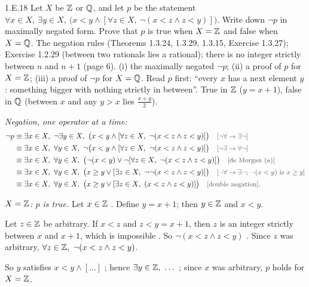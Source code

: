 \begin{bookex}[essential]{1.E.18}
Let $X$ be $\mathbb{Z}$ or $\mathbb{Q}$, and let $p$ be the statement $\forall x\in X,\ \exists y\in X,\ \big(x<y\wedge[\forall z\in X,\ \neg(x<z\wedge z<y)]\big)$. Write down $\neg p$ in maximally negated form. Prove that $p$ is true when $X=\mathbb{Z}$ and false when $X=\mathbb{Q}$.
\solution
\given The negation rules (Theorems 1.3.24, 1.3.29, 1.3.15, Exercise 1.3.27); Exercise 1.2.29 (between two rationals lies a rational); there is no integer strictly between $n$ and $n+1$ (page 6).
\goal (i) the maximally negated $\neg p$; (ii) a proof of $p$ for $X=\mathbb{Z}$; (iii) a proof of $\neg p$ for $X=\mathbb{Q}$.
\plan Read $p$ first: ``every $x$ has a next element $y$: something bigger with nothing strictly in between''. True in $\mathbb{Z}$ ($y=x+1$), false in $\mathbb{Q}$ (between $x$ and any $y>x$ lies $\frac{x+y}2$).
\begin{steps}
\item \emph{Negation, one operator at a time:}
\begin{align*}
\neg p&\equiv\exists x\in X,\ \neg\exists y\in X,\ \big(x<y\wedge[\forall z\in X,\ \neg(x<z\wedge z<y)]\big)\why{$\neg\forall\to\exists\neg$}\\
&\equiv\exists x\in X,\ \forall y\in X,\ \neg\big(x<y\wedge[\forall z\in X,\ \neg(x<z\wedge z<y)]\big)\why{$\neg\exists\to\forall\neg$}\\
&\equiv\exists x\in X,\ \forall y\in X,\ \big(\neg(x<y)\vee\neg[\forall z\in X,\ \neg(x<z\wedge z<y)]\big)\why{de Morgan (a)}\\
&\equiv\exists x\in X,\ \forall y\in X,\ \big(x\ge y\vee[\exists z\in X,\ \neg\neg(x<z\wedge z<y)]\big)\why{$\neg\forall\to\exists\neg$; $\neg(x<y)$ is $x\ge y$}\\
&\equiv\exists x\in X,\ \forall y\in X,\ \big(x\ge y\vee[\exists z\in X,\ (x<z\wedge z<y)]\big)\why{double negation}.
\end{align*}
\item \emph{$X=\mathbb{Z}$: $p$ is true.} Let $x\in\mathbb{Z}$ . Define $y=x+1$; then $y\in\mathbb{Z}$  and $x<y$.
\item Let $z\in\mathbb{Z}$ be arbitrary. If $x<z$ and $z<y=x+1$, then $z$ is an integer strictly between $x$ and $x+1$, which is impossible . So $\neg(x<z\wedge z<y)$ . Since $z$ was arbitrary, $\forall z\in\Z,\ \neg(x<z\wedge z<y)$.
\item So $y$ satisfies $x<y\wedge[\dots]$ ; hence $\exists y\in\mathbb{Z},\ \dots$ ; since $x$ was arbitrary, $p$ holds for $X=\mathbb{Z}$.

\end{steps}
\end{bookex}
